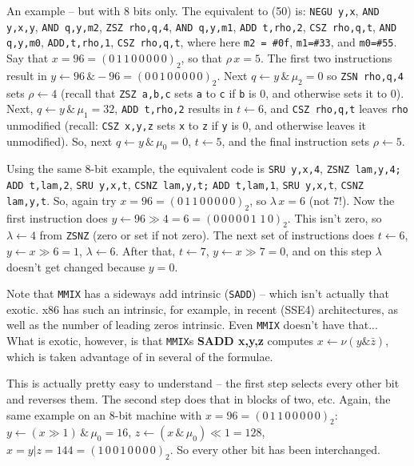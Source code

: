 An example -- but with 8 bits only.  The equivalent to (50)
is: {\tt NEGU y,x}, {\tt AND y,x,y}, {\tt AND q,y,m2}, {\tt ZSZ rho,q,4},
{\tt AND q,y,m1}, {\tt ADD t,rho,2}, {\tt CSZ rho,q,t},
{\tt AND q,y,m0}, {\tt ADD,t,rho,1}, {\tt CSZ rho,q,t},
where here \hbox{\tt m2 = \#0f}, {\tt m1=\#33}, and {\tt m0=\#55}.
Say that $x = 96 = \left(0\,1\,1\,0\,0\,0\,0\,0\right)_2$,
so that $\rho\,x = 5$.  The first two instructions result in
$y \gets 96\, \& -96 = \left(0\,0\,1\,0\,0\,0\,0\,0\right)_2$.
Next $q \gets y\, \& \,\mu_2 = 0$ so {\tt ZSN rho,q,4} sets $\rho \gets 4$
(recall that {\tt ZSZ a,b,c} sets {\tt a} to {\tt c} if {\tt b} is 0, and
otherwise sets it to 0).  Next, $q \gets y\, \& \,\mu_1 = 32$, {\tt ADD t,rho,2} 
results in $t \gets 6$, and {\tt CSZ rho,q,t} leaves {\tt rho} unmodified
(recall: {\tt CSZ x,y,z} sets {\tt x} to {\tt z} if {\tt y} is 0, and otherwise
leaves it unmodified).  So, next $q \gets y\, \& \, \mu_0 = 0$,
$t \gets 5$, and the final instruction sets $\rho \gets 5$.


\noindent [p 142] Using the same 8-bit example, the equivalent
code is {\tt SRU y,x,4}, {\tt ZSNZ lam,y,4;} {\tt ADD t,lam,2},
{\tt SRU y,x,t}, {\tt CSNZ lam,y,t;} {\tt ADD t,lam,1}, {\tt SRU y,x,t},
{\tt CSNZ lam,y,t}. So, again try $x = 96 = 
\left(0\,1\,1\,0\,0\,0\,0\,0\right)_2$, so $\lambda\,x = 6$ (not 7!).  
Now the first instruction
does $y \gets 96 \gg 4 = 6 = \left(0\, 0\, 0\, 0\, 0\, 1\, \,1 \,0\right)_2$.
This isn't zero, so $\lambda \gets 4$ from {\tt ZSNZ} (zero or set
if not zero).  The next set of instructions does $t \gets 6$,
$y \gets x \gg 6 = 1$, $\lambda \gets 6$.  After that, $t \gets 7$,
$y \gets x \gg 7 = 0$, and on this step $\lambda$ doesn't get changed
because $y = 0$.


\noindent [p 143] Note that {\tt MMIX} has a sideways add intrinsic
({\tt SADD}) -- which isn't actually that exotic.  x86 has such an intrinsic,
for example, in recent (SSE4) architectures, as well as the number of
leading zeros intrinsic.  Even {\tt MMIX} doesn't have that...  What
is exotic, however, is that {\tt MMIX}s {\bf SADD x,y,z}
computes $x \gets \nu \! \left(y \& \bar{z}\right)$, which is
taken advantage of in several of the formulae.


\noindent [p 144] 
This is actually pretty easy to understand -- the
first step selects every other bit and reverses them.
The second step does that in blocks of two, etc.
Again, the same example on an 8-bit machine
with $x = 96 = \left(0\,1\,1\,0\,0\,0\,0\,0\right)_2$:
$y \gets \left(x \gg 1\right) \, \& \, \mu_0 = 16$,
$z \gets \left(x \, \& \, \mu_0\right) \ll 1 = 128$,
$x = y | z = 144 = \left(1\,0\,0\,1\,0\,0\,0\,0\right)_2$.
So every other bit has been interchanged.

